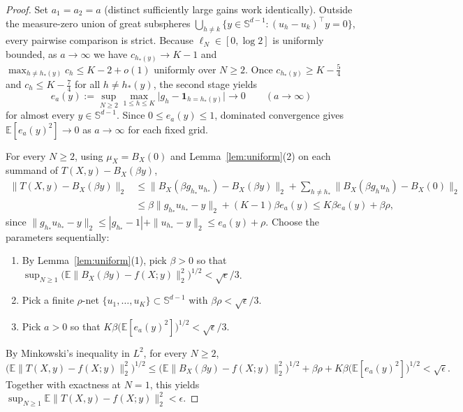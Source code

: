 \documentclass[11pt]{article}
\theoremstyle{plain}
\theoremstyle{definition}
\theoremstyle{remark}
\begin{document}
\begin{proof}
Set $a_1 = a_2 = a$ (distinct sufficiently large gains work identically).
Outside the measure-zero union of great subspheres $\bigcup_{h \neq k}\{y \in \mathbb{S}^{d-1} : (u_h - u_k)^\top y = 0\}$, every pairwise comparison is strict.
Because $\ell_N \in [0, \log 2]$ is uniformly bounded, as $a \to \infty$ we have $c_{h_*(y)} \to K - 1$ and $\max_{h \neq h_*(y)} c_h \le K - 2 + o(1)$ uniformly over $N \ge 2$.
Once $c_{h_*(y)} \ge K - \tfrac{5}{4}$ and $c_h \le K - \tfrac{7}{4}$ for all $h \neq h_*(y)$, the second stage yields
\[
e_a(y) := \sup_{N \ge 2} \max_{1 \le h \le K} \bigl|g_h - \mathbf{1}_{h = h_*(y)}\bigr| \longrightarrow 0
\qquad (a \to \infty)
\]
for almost every $y \in \mathbb{S}^{d-1}$.
Since $0 \le e_a(y) \le 1$, dominated convergence gives $\mathbb{E}[e_a(y)^2] \to 0$ as $a \to \infty$ for each fixed grid.

For every $N \ge 2$, using $\mu_X = B_X(0)$ and Lemma~\ref{lem:uniform}(2) on each summand of $T(X, y) - B_X(\beta y)$,
\begin{align*}
\bigl\|T(X, y) - B_X(\beta y)\bigr\|_2
&\le \bigl\|B_X(\beta g_{h_*} u_{h_*}) - B_X(\beta y)\bigr\|_2
   + \sum_{h \neq h_*} \bigl\|B_X(\beta g_h u_h) - B_X(0)\bigr\|_2 \\
&\le \beta\|g_{h_*} u_{h_*} - y\|_2 + (K - 1)\beta e_a(y)
 \le K\beta e_a(y) + \beta\rho,
\end{align*}
since $\|g_{h_*} u_{h_*} - y\|_2 \le |g_{h_*} - 1| + \|u_{h_*} - y\|_2 \le e_a(y) + \rho$.
Choose the parameters sequentially:
\begin{enumerate}[label=\textup{(\roman*)},leftmargin=2.2em,itemsep=1pt]
\item By Lemma~\ref{lem:uniform}(1), pick $\beta > 0$ so that $\sup_{N \ge 1} \bigl(\mathbb{E}\|B_X(\beta y) - f(X; y)\|_2^2\bigr)^{1/2} < \sqrt{\epsilon}/3$.
\item Pick a finite $\rho$-net $\{u_1, \dots, u_K\} \subset \mathbb{S}^{d-1}$ with $\beta\rho < \sqrt{\epsilon}/3$.
\item Pick $a > 0$ so that $K\beta\bigl(\mathbb{E}[e_a(y)^2]\bigr)^{1/2} < \sqrt{\epsilon}/3$.
\end{enumerate}
By Minkowski's inequality in $L^2$, for every $N \ge 2$,
\[
\bigl(\mathbb{E}\|T(X, y) - f(X; y)\|_2^2\bigr)^{1/2}
\le \bigl(\mathbb{E}\|B_X(\beta y) - f(X; y)\|_2^2\bigr)^{1/2} + \beta\rho + K\beta\bigl(\mathbb{E}[e_a(y)^2]\bigr)^{1/2}
< \sqrt{\epsilon}.
\]
Together with exactness at $N = 1$, this yields $\sup_{N \ge 1}\mathbb{E}\|T(X, y) - f(X; y)\|_2^2 < \epsilon$.
\end{proof}
\end{document}
